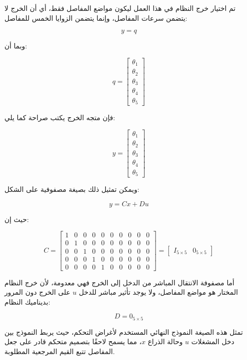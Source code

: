 تم اختيار خرج النظام في هذا العمل ليكون مواضع المفاصل فقط، أي أن الخرج لا يتضمن سرعات المفاصل، وإنما يتضمن الزوايا الخمس للمفاصل:

\begin{equation}
y=q
\label{eq:control_output_q}
\end{equation}

وبما أن:

\begin{equation}
q=
\begin{bmatrix}
\theta_1\\
\theta_2\\
\theta_3\\
\theta_4\\
\theta_5
\end{bmatrix}
\end{equation}

فإن متجه الخرج يكتب صراحة كما يلي:

\begin{equation}
y=
\begin{bmatrix}
\theta_1\\
\theta_2\\
\theta_3\\
\theta_4\\
\theta_5
\end{bmatrix}
\label{eq:control_output_vector}
\end{equation}

ويمكن تمثيل ذلك بصيغة مصفوفية على الشكل:

\begin{equation}
y=Cx+Du
\label{eq:control_output_state_relation}
\end{equation}

حيث إن:

\begin{equation}
C=
\begin{bmatrix}
1 & 0 & 0 & 0 & 0 & 0 & 0 & 0 & 0 & 0\\
0 & 1 & 0 & 0 & 0 & 0 & 0 & 0 & 0 & 0\\
0 & 0 & 1 & 0 & 0 & 0 & 0 & 0 & 0 & 0\\
0 & 0 & 0 & 1 & 0 & 0 & 0 & 0 & 0 & 0\\
0 & 0 & 0 & 0 & 1 & 0 & 0 & 0 & 0 & 0
\end{bmatrix}
=
\begin{bmatrix}
I_{5\times5} & 0_{5\times5}
\end{bmatrix}
\label{eq:control_C_matrix}
\end{equation}

أما مصفوفة الانتقال المباشر من الدخل إلى الخرج فهي معدومة، لأن خرج النظام المختار هو مواضع المفاصل، ولا يوجد تأثير مباشر للدخل \(u\) على الخرج دون المرور بديناميك النظام:

\begin{equation}
D=0_{5\times5}
\label{eq:control_D_matrix}
\end{equation}

تمثل هذه الصيغة النموذج النهائي المستخدم لأغراض التحكم، حيث يربط النموذج بين دخل المشغلات \(u\) وحالة الذراع \(x\)، مما يسمح لاحقًا بتصميم متحكم قادر على جعل المفاصل تتبع القيم المرجعية المطلوبة.